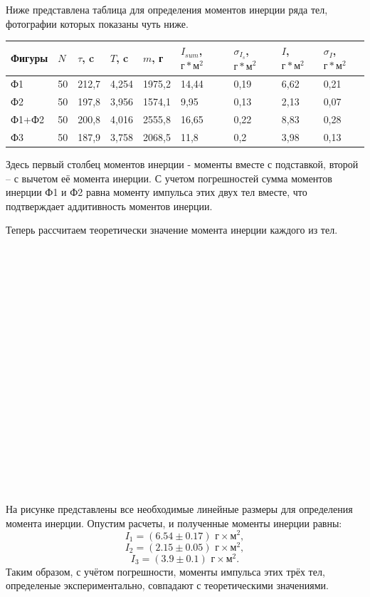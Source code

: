 \documentclass[a4paper, 12pt]{article}%
\begin{document}
Ниже представлена таблица для определения моментов инерции ряда тел, фотографии которых показаны чуть ниже.

\begin{table}
\centering
\begin{tabular}{|l|l|l|l|l|l|l|l|l|} 
\hline
Фигуры & $N$ & $\tau$, c & $T$, c & $m$, г & $I_{sum}$, $\text{г}*\text{м}^2$ & $\sigma_{I_s}$, $\text{г}*\text{м}^2$ & $I$, $\text{г}*\text{м}^2$ & $\sigma_I$, $\text{г}*\text{м}^2$  \\ 
\hline
Ф1      & 50     & 212,7                       & 4,254     & 1975,2    & 14,44               & 0,19                                  & 6,62       & 0,21                                 \\ 
\hline
Ф2      & 50     & 197,8                       & 3,956     & 1574,1    & 9,95               & 0,13                                  & 2,13       & 0,07                                \\ 
\hline
Ф1+Ф2   & 50     & 200,8                       & 4,016     & 2555,8    & 16,65               & 0,22                                  & 8,83       & 0,28                                \\ 
\hline
Ф3      & 50     & 187,9                       & 3,758     & 2068,5    & 11,8               & 0,2                                 & 3,98       & 0,13                                \\
\hline
\end{tabular}
\end{table}

Здесь первый столбец моментов инерции - моменты вместе с подставкой, второй -- с вычетом её момента инерции. С учетом погрешностей сумма моментов инерции Ф1 и Ф2 равна моменту импульса этих двух тел вместе, что подтверждает аддитивность моментов инерции.

Теперь рассчитаем теоретически значение момента инерции каждого из тел. 
\\ \\ \\ \\ \\ \\ \\ \\ \\ \\ \\ \\ \\ \\ \\ \\ \\ \\ \\ \\
На рисунке представлены все необходимые линейные размеры для определения момента инерции. Опустим расчеты, и полученные моменты инерции равны: 
\[I_1=(6.54\pm0.17) \text{  г}\times\text{м}^2,\]
\[I_2=(2.15\pm0.05) \text{  г}\times\text{м}^2,\]
\[I_3=(3.9\pm0.1) \text{  г}\times\text{м}^2.\]
Таким образом, с учётом погрешности, моменты импульса этих трёх тел, определеные экспериментально, совпадают с теоретическими значениями.
\end{document}
